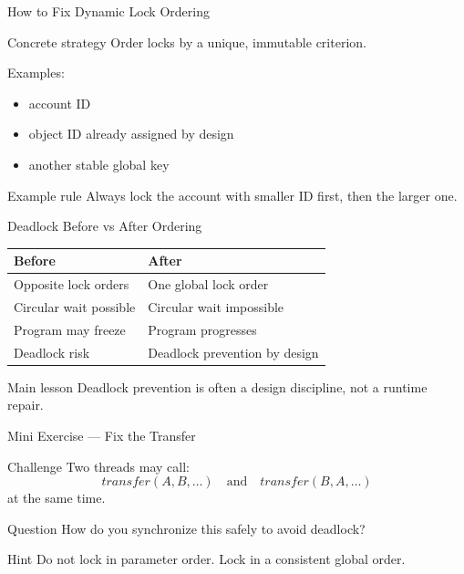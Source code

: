 \documentclass[aspectratio=169,11pt]{beamer}
\begin{document}
	\begin{frame}{How to Fix Dynamic Lock Ordering}
		\begin{block}{Concrete strategy}
			Order locks by a unique, immutable criterion.
		\end{block}
		
		\bigskip
		
		Examples:
		\begin{itemize}
			\item account ID
			\item object ID already assigned by design
			\item another stable global key
		\end{itemize}
		
		\bigskip
		
		\begin{alertblock}{Example rule}
			Always lock the account with smaller ID first, then the larger one.
		\end{alertblock}
	\end{frame}
	
	\begin{frame}{Deadlock Before vs After Ordering}
		\centering
		\begin{tabular}{@{}ll@{}}
			\toprule
			\textbf{Before} & \textbf{After} \\
			\midrule
			Opposite lock orders & One global lock order \\
			Circular wait possible & Circular wait impossible \\
			Program may freeze & Program progresses \\
			Deadlock risk & Deadlock prevention by design \\
			\bottomrule
		\end{tabular}
		
		\bigskip
		
		\begin{alertblock}{Main lesson}
			Deadlock prevention is often a design discipline, not a runtime repair.
		\end{alertblock}
	\end{frame}
	
	\begin{frame}{Mini Exercise --- Fix the Transfer}
		\begin{block}{Challenge}
			Two threads may call:
			\[
			transfer(A,B,\dots) \quad \text{and} \quad transfer(B,A,\dots)
			\]
			at the same time.
		\end{block}
		
		\bigskip
		
		\begin{alertblock}{Question}
			How do you synchronize this safely to avoid deadlock?
		\end{alertblock}
		
		\begin{block}{Hint}
			Do not lock in parameter order.  
			Lock in a consistent global order.
		\end{block}
	\end{frame}
	
\end{document}
